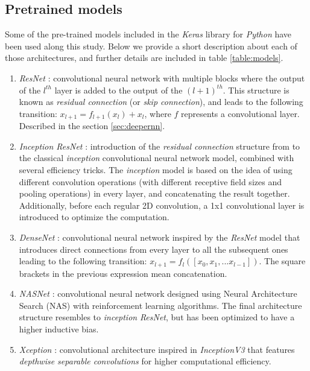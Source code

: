 \subsection{Pretrained models}
Some of the pre-trained models included in the \textit{Keras} library for \textit{Python} \autocite{chollet2015keras} have been used along this study. Below we provide a short description about each of those architectures, and further details are included in table \ref{table:models}.

\begin{enumerate}
   	\item \textit{ResNet} \autocite{he2016}: convolutional neural network with multiple blocks where the output of the $l^{th}$ layer is added to the output of the $(l+1)^{th}$. This structure is known as \textit{residual connection} (or \textit{skip connection}), and leads to the following transition: $x_{l+1} = f_{l+1}(x_{l}) + x_l$, where $f$ represents a convolutional layer. Described in the section \ref{sec:deepernn}.
   	\item \textit{Inception ResNet} \autocite{szegedy2017}: introduction of the \textit{residual connection} structure from \autocite{he2016} to the classical \textit{inception} convolutional neural network model, combined with several efficiency tricks. The \textit{inception} model is based on the idea of using different convolution operations (with different receptive field sizes and pooling operations) in every layer, and concatenating the result together. Additionally, before each regular 2D convolution, a 1x1 convolutional layer is introduced to optimize the computation.
   	\item \textit{DenseNet} \autocite{huang2017}: convolutional neural network inspired by the \textit{ResNet} model \autocite{he2016} that introduces direct connections from every layer to all the subsequent ones leading to the following transition: $x_{l+1} = f_l([x_0, x_1, ... x_{l-1}])$. The square brackets in the previous expression mean concatenation.
   	\item \textit{NASNet} \autocite{pham2018}: convolutional neural network designed using Neural Architecture Search (NAS) with reinforcement learning algorithms. The final architecture structure resembles to \textit{inception} \textit{ResNet}, but has been optimized to have a higher inductive bias.
   	\item \textit{Xception} \autocite{chollet2017}: convolutional architecture inspired in \textit{InceptionV3}  \autocite{szegedy2016} that features \textit{depthwise separable convolutions} for higher computational efficiency.

\end{enumerate}
